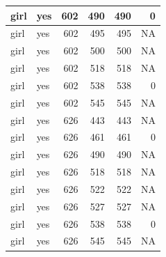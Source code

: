 \documentclass[man]{apa6}
\begin{document}
\begin{tabular}{l|l|r|r|r|r}
\hline
girl & yes & 602 & 490 & 490 & 0\\
\hline
girl & yes & 602 & 495 & 495 & NA\\
\hline
girl & yes & 602 & 500 & 500 & NA\\
\hline
girl & yes & 602 & 518 & 518 & NA\\
\hline
girl & yes & 602 & 538 & 538 & 0\\
\hline
girl & yes & 602 & 545 & 545 & NA\\
\hline
girl & yes & 626 & 443 & 443 & NA\\
\hline
girl & yes & 626 & 461 & 461 & 0\\
\hline
girl & yes & 626 & 490 & 490 & NA\\
\hline
girl & yes & 626 & 518 & 518 & NA\\
\hline
girl & yes & 626 & 522 & 522 & NA\\
\hline
girl & yes & 626 & 527 & 527 & NA\\
\hline
girl & yes & 626 & 538 & 538 & 0\\
\hline
girl & yes & 626 & 545 & 545 & NA\\
\hline
\end{tabular}
\end{document}
